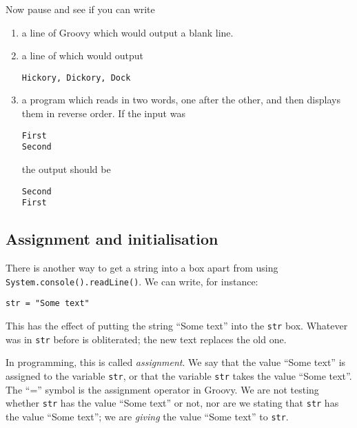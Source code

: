 Now pause and see if you can write
\begin{enumerate}
\item
a line of Groovy which would output a blank line.
\item
a line of  which would output

\begin{Verbatim}
Hickory, Dickory, Dock
\end{Verbatim}

\item
a program which reads in two words, one after the other, and then displays them
in reverse order. If the input was 

\begin{Verbatim}
First
Second
\end{Verbatim}

the output should be

\begin{Verbatim}
Second
First
\end{Verbatim}

\end{enumerate}


\subsection{Assignment and initialisation}

There is another way to get a string into a box apart from using
\verb!System.console().readLine()!.  We can write, for instance:

\begin{Verbatim}
str = "Some text"
\end{Verbatim}

This has the effect of putting the string ``Some text'' into the
\verb!str! box.  Whatever was in \verb!str! before is obliterated; the
new text replaces the old one. 

In programming, this is called \emph{assignment}.  We say that the
value ``Some text'' is
assigned to the variable \verb!str!, or that the variable \verb!str! takes the
value ``Some text''.  The ``='' symbol is the assignment operator in Groovy.  We are not
testing whether \verb!str! has the value ``Some text'' or not, nor are we stating that
\verb!str! has the value ``Some text''; we are \emph{giving} the value
``Some text'' to \verb!str!.

%

